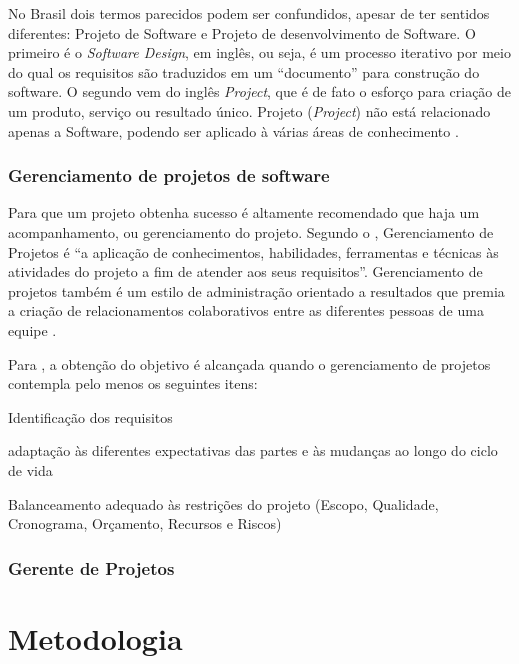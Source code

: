 \documentclass[
    12pt,               %
    openright,          %
    twoside,            %
    a4paper,            %
    chapter=TITLE,     %
    english,            %
    spanish,            %
    portuguese              %
    ]{abntex2}
\newcommand\dblquote[1]{\textquotedblleft #1\textquotedblright}
\begin{document}
No Brasil dois termos parecidos podem ser confundidos, apesar de ter sentidos diferentes: Projeto de Software e Projeto de desenvolvimento de Software. O primeiro é o \textit{\textit{Software Design}}, em inglês, ou seja, é um processo iterativo por meio do qual os requisitos são traduzidos em um \dblquote{documento} para construção do software. O segundo vem do inglês \textit{\textit{Project}}, que é de fato o esforço para criação de um produto, serviço ou resultado único. Projeto (\textit{\textit{Project}}) não está relacionado apenas a Software, podendo ser aplicado à várias áreas de conhecimento \cite{pressman2006}.

\subsection{Gerenciamento de projetos de software}

Para que um projeto obtenha sucesso é altamente recomendado que haja um acompanhamento, ou gerenciamento do projeto. Segundo o , Gerenciamento de Projetos é \dblquote{a aplicação de conhecimentos, habilidades, ferramentas e técnicas às atividades do projeto a fim de atender aos seus requisitos}. Gerenciamento de projetos também é um estilo de administração orientado a resultados que premia a criação de relacionamentos colaborativos entre as diferentes pessoas de uma equipe \cite[p.~3]{grayLarson2009}.

Para , a obtenção do objetivo é alcançada quando o gerenciamento de projetos contempla pelo menos os seguintes itens:
\begin{alineas}
	\item Identificação dos requisitos
	\item adaptação às diferentes expectativas das partes e às mudanças ao longo do ciclo de vida
	\item Balanceamento adequado às restrições do projeto (Escopo, Qualidade, Cronograma, Orçamento, Recursos e Riscos)
\end{alineas}

\subsection{Gerente de Projetos}



\chapter{Metodologia}
\end{document}
